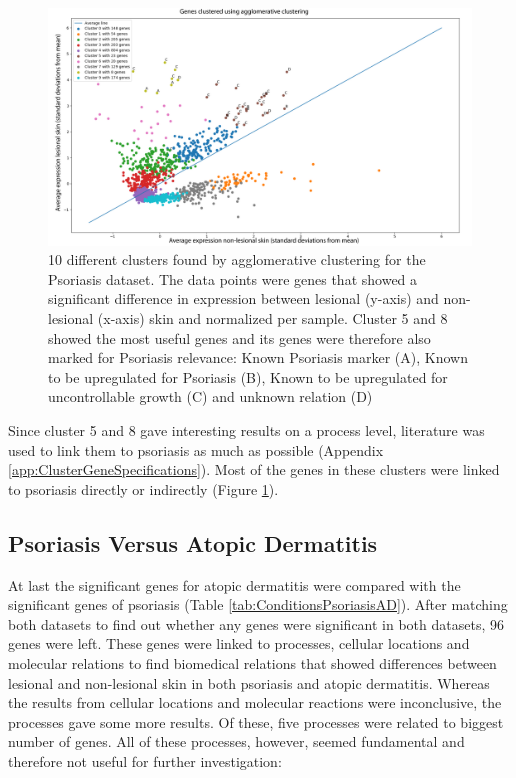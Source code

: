 \documentclass[10pt,a4paper]{article}
\begin{document}
	\begin{figure}[H]
		\includegraphics[width=\textwidth]{Cluster_Results.png}
	
		\caption{10 different clusters found by agglomerative clustering for the Psoriasis dataset. The data points were genes that showed a significant difference in expression between lesional (y-axis) and non-lesional (x-axis) skin and normalized per sample. Cluster 5 and 8 showed the most useful genes and its genes were therefore also marked for Psoriasis relevance: Known Psoriasis marker (A), Known to be upregulated for Psoriasis (B), Known to be upregulated for uncontrollable growth (C) and unknown relation (D)}
		\label{fig:ClusteredGenes}
	\end{figure}
	
	Since cluster 5 and 8 gave interesting results on a process level, literature was used to link them to psoriasis as much as possible (Appendix \ref{app:ClusterGeneSpecifications}). Most of the genes in these clusters were linked to psoriasis directly or indirectly (Figure \ref{fig:ClusteredGenes}).
	
	\subsection{Psoriasis Versus Atopic Dermatitis}
	\label{subsec:ResultsPsoriasisVersusAtopicDermatitis}
	
	At last the significant genes for atopic dermatitis were compared with the significant genes of psoriasis (Table \ref{tab:ConditionsPsoriasisAD}). After matching both datasets to find out whether any genes were significant in both datasets, 96 genes were left. These genes were linked to processes, cellular locations and molecular relations to find biomedical relations that showed differences between lesional and non-lesional skin in both psoriasis and atopic dermatitis. Whereas the results from cellular locations and molecular reactions were inconclusive, the processes gave some more results. Of these, five processes were related to biggest number of genes. All of these processes, however, seemed fundamental and therefore not useful for further investigation:
	
\end{document}
